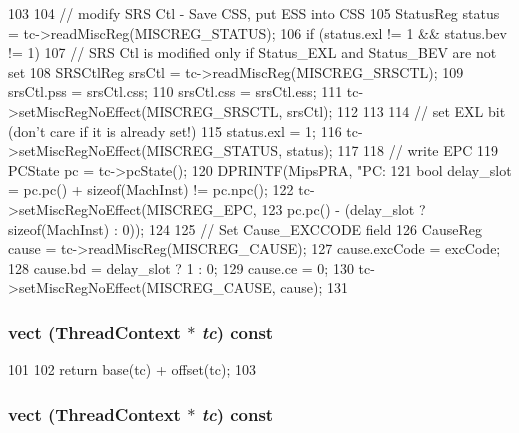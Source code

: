 \begin{DoxyCode}
103 {
104     // modify SRS Ctl - Save CSS, put ESS into CSS
105     StatusReg status = tc->readMiscReg(MISCREG_STATUS);
106     if (status.exl != 1 && status.bev != 1) {
107         // SRS Ctl is modified only if Status_EXL and Status_BEV are not set
108         SRSCtlReg srsCtl = tc->readMiscReg(MISCREG_SRSCTL);
109         srsCtl.pss = srsCtl.css;
110         srsCtl.css = srsCtl.ess;
111         tc->setMiscRegNoEffect(MISCREG_SRSCTL, srsCtl);
112     }
113 
114     // set EXL bit (don't care if it is already set!)
115     status.exl = 1;
116     tc->setMiscRegNoEffect(MISCREG_STATUS, status);
117 
118     // write EPC
119     PCState pc = tc->pcState();
120     DPRINTF(MipsPRA, "PC: %
121     bool delay_slot = pc.pc() + sizeof(MachInst) != pc.npc();
122     tc->setMiscRegNoEffect(MISCREG_EPC,
123             pc.pc() - (delay_slot ? sizeof(MachInst) : 0));
124 
125     // Set Cause_EXCCODE field
126     CauseReg cause = tc->readMiscReg(MISCREG_CAUSE);
127     cause.excCode = excCode;
128     cause.bd = delay_slot ? 1 : 0;
129     cause.ce = 0;
130     tc->setMiscRegNoEffect(MISCREG_CAUSE, cause);
131 }
\end{DoxyCode}
\hypertarget{classMipsISA_1_1MipsFaultBase_a1052109661a1cc9f7847b80b8b98450b}{
\subsubsection[{vect}]{ vect ({\bf ThreadContext} $\ast$ {\em tc}) const}}
\label{classMipsISA_1_1MipsFaultBase_a1052109661a1cc9f7847b80b8b98450b}



\begin{DoxyCode}
101     {
102         return base(tc) + offset(tc);
103     }
\end{DoxyCode}
\hypertarget{classMipsISA_1_1MipsFaultBase_a1052109661a1cc9f7847b80b8b98450b}{
\subsubsection[{vect}]{ vect ({\bf ThreadContext} $\ast$ {\em tc}) const}}
\label{classMipsISA_1_1MipsFaultBase_a1052109661a1cc9f7847b80b8b98450b}



